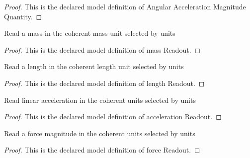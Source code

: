 \begin{proof}
  This is the declared model definition of Angular Acceleration Magnitude Quantity.
\end{proof}
\begin{definition}
  \label{def:physics:phyx-mini-0783:phyxminiproblems-problemphyxmini0783-massreadout}
  Read a mass in the coherent mass unit selected by units
\end{definition}
\begin{proof}
  This is the declared model definition of mass Readout.
\end{proof}
\begin{definition}
  \label{def:physics:phyx-mini-0783:phyxminiproblems-problemphyxmini0783-lengthreadout}
  Read a length in the coherent length unit selected by units
\end{definition}
\begin{proof}
  This is the declared model definition of length Readout.
\end{proof}
\begin{definition}
  \label{def:physics:phyx-mini-0783:phyxminiproblems-problemphyxmini0783-accelerationreadout}
  Read linear acceleration in the coherent units selected by units
\end{definition}
\begin{proof}
  This is the declared model definition of acceleration Readout.
\end{proof}
\begin{definition}
  \label{def:physics:phyx-mini-0783:phyxminiproblems-problemphyxmini0783-forcereadout}
  Read a force magnitude in the coherent units selected by units
\end{definition}
\begin{proof}
  This is the declared model definition of force Readout.
\end{proof}
